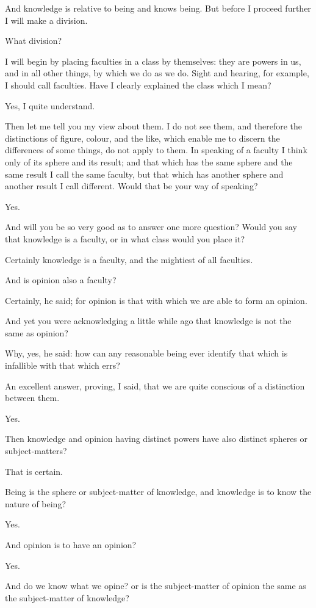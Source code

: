 And knowledge is relative to being and knows being. But before I proceed
further I will make a division.

What division?

I will begin by placing faculties in a class by themselves: they are
powers in us, and in all other things, by which we do as we do. Sight
and hearing, for example, I should call faculties. Have I clearly
explained the class which I mean?

Yes, I quite understand.

Then let me tell you my view about them. I do not see them, and
therefore the distinctions of figure, colour, and the like, which enable
me to discern the differences of some things, do not apply to them. In
speaking of a faculty I think only of its sphere and its result; and
that which has the same sphere and the same result I call the same
faculty, but that which has another sphere and another result I call
different. Would that be your way of speaking?

Yes.

And will you be so very good as to answer one more question? Would you
say that knowledge is a faculty, or in what class would you place it?

Certainly knowledge is a faculty, and the mightiest of all faculties.

And is opinion also a faculty?

Certainly, he said; for opinion is that with which we are able to form
an opinion.

And yet you were acknowledging a little while ago that knowledge is not
the same as opinion?

Why, yes, he said: how can any reasonable being ever identify that which
is infallible with that which errs?

An excellent answer, proving, I said, that we are quite conscious of a
distinction between them.

Yes.

Then knowledge and opinion having distinct powers have also distinct
spheres or subject-matters?

That is certain.

Being is the sphere or subject-matter of knowledge, and knowledge is to
know the nature of being?

Yes.

And opinion is to have an opinion?

Yes.

And do we know what we opine? or is the subject-matter of opinion the
same as the subject-matter of knowledge?

